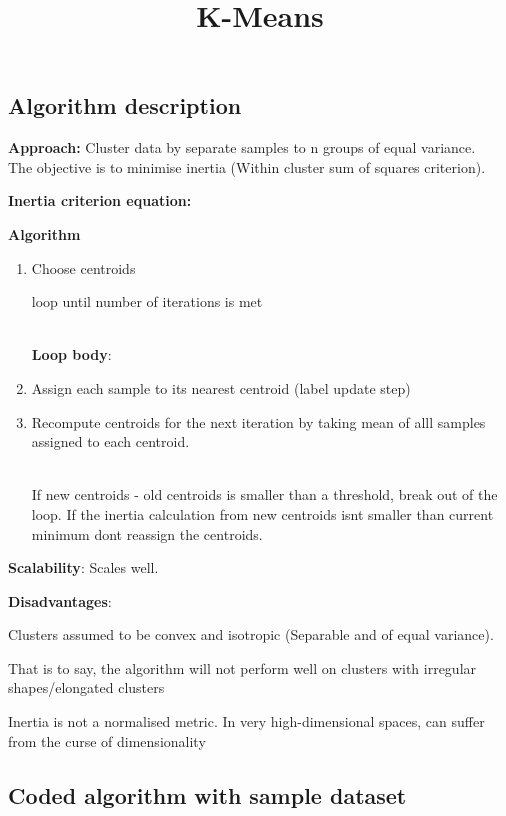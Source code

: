 \documentclass[
]{article}
\title{K-Means}
\author{}
\date{}
\providecommand{\tightlist}{%
  \setlength{\itemsep}{0pt}\setlength{\parskip}{0pt}}
\begin{document}
\maketitle

\subsection{Algorithm description}\label{algorithm-description}

\textbf{Approach:} Cluster data by separate samples to n groups of equal
variance.\\
The objective is to minimise inertia (Within cluster sum of squares
criterion).

\textbf{Inertia criterion equation:}

\textbf{Algorithm}

\begin{enumerate}
\tightlist
\item
  Choose centroids

  loop until number of iterations is met\\
  \strut \\
  \textbf{Loop body}:
\item
  Assign each sample to its nearest centroid (label update step)

  \hfill\break
\item
  Recompute centroids for the next iteration by taking mean of alll
  samples assigned to each centroid.\\
  \strut \\
  If new centroids - old centroids is smaller than a threshold, break
  out of the loop. If the inertia calculation from new centroids
  isn\textquotesingle t smaller than current minimum
  don\textquotesingle t reassign the centroids.
\end{enumerate}

\textbf{Scalability}: Scales well.

\textbf{Disadvantages}:

Clusters assumed to be convex and isotropic (Separable and of equal
variance).

That is to say, the algorithm will not perform well on clusters with
irregular shapes/elongated clusters

Inertia is not a normalised metric. In very high-dimensional spaces, can
suffer from the curse of dimensionality

\subsection{Coded algorithm with sample
dataset}\label{coded-algorithm-with-sample-dataset}
\end{document}
